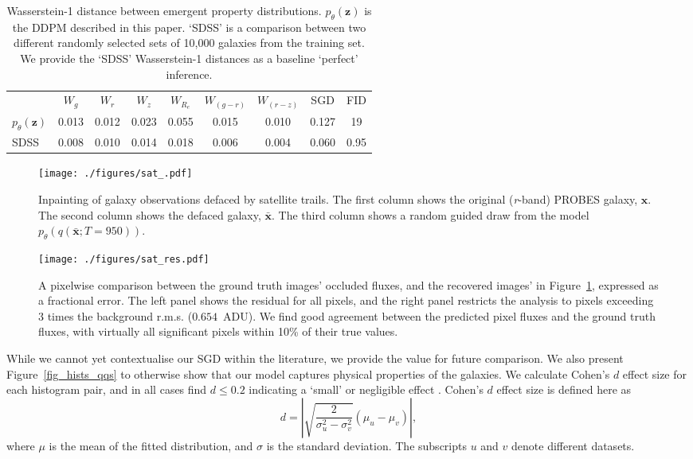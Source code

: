 \documentclass[fleqn,usenatbib]{mnras}
\begin{document}
\begin{table}
    \centering
    \caption{Wasserstein-1 distance between emergent property distributions.
    $p_\theta(\mathbf{z})$ is the DDPM described in this paper. `SDSS' is
    a comparison between two different randomly selected sets of 10,000
    galaxies from the training set. We provide the `SDSS' Wasserstein-1 distances
    as a baseline `perfect' inference.}
    \setlength\tabcolsep{3pt}
    \begin{tabular}{l c c c c c c c c}
        \toprule
        & $W_{g}$ & $W_{r}$ & $W_{z}$ & $W_{R_e}$ & $W_{(g - r)}$ & $W_{(r - z)}$ & SGD & FID \\
        \cmidrule(r){1-7} \cmidrule(l){8-9}
        $p_\theta(\mathbf{z})$ & 0.013 & 0.012 & 0.023 & 0.055 & 0.015 & 0.010 & 0.127 & 19 \\
        SDSS & 0.008 & 0.010 & 0.014 & 0.018 & 0.006 & 0.004 & 0.060 & 0.95 \\
        \bottomrule
    \end{tabular}
    \label{tab_results}
\end{table}

\begin{figure}
    \texttt{[image: ./figures/sat\_.pdf]}
    \caption{Inpainting of galaxy observations defaced by satellite trails. The
    first column shows the original ({\it r}-band)  PROBES galaxy,
    $\mathbf{x}$. The second column shows the defaced galaxy,
    $\mathbf{\bar{x}}$. The third column shows a random guided draw from the
    model $p_\theta(q(\mathbf{\bar{x}}; T=950))$.}
    \label{fig_sats}
\end{figure}

\begin{figure}
    \centering
    \texttt{[image: ./figures/sat\_res.pdf]}
    \caption{A pixelwise comparison between the ground truth images' occluded
    fluxes, and the recovered images' in Figure~\ref{fig_sats}, expressed as a
    fractional error. The left panel shows the residual for all pixels, and the
    right panel restricts the analysis to pixels exceeding 3 times the
    background r.m.s. ($0.654$~ADU).  We find good agreement
    between the predicted pixel fluxes and the ground truth fluxes, with
    virtually all significant pixels within 10\% of their true values.}
    \label{fig_sats2}
\end{figure}

While we cannot yet contextualise our SGD within the literature, we provide the
value for future comparison. We also present Figure~\ref{fig_hists_qqs} to
otherwise show that our model captures physical properties of the galaxies. We
calculate Cohen's $d$ effect size for each histogram pair, and in all cases
find $d \le 0.2$ indicating a `small' or negligible effect
\citep{cite_cohen1988}. 
Cohen's $d$ effect size is defined here as
\begin{equation}
    d = \left|\sqrt{\frac{2}{\sigma_u^2 - \sigma_v^2}}\left(\mu_u - \mu_v\right)\right|,
\end{equation}
where $\mu$ is the mean of the fitted distribution, and $\sigma$ is the standard
deviation. The subscripts $u$ and $v$ denote different datasets.
\end{document}
